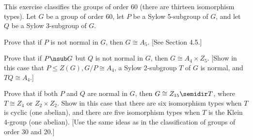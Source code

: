 \begin{specialexercise}\label{ex5.5.14}
    This exercise classifies the groups of order 60 (there are thirteen isomorphism types). Let $G$ be a group of order 60, let $P$ be a Sylow 5-subgroup of $G$, and let $Q$ be a Sylow 3-subgroup of $G$.
    \begin{subproblems}
        \item Prove that if $P$ is not normal in $G$, then $G \cong A_5$. [See Section 4.5.]
        \item Prove that if $P \nsub G$ but $Q$ is not normal in $G$, then $G \cong A_4 \times Z_5$. [Show in this case that $P \leq Z(G), G/P \cong A_4$, a Sylow 2-subgroup $T$ of $G$ is normal, and $TQ \cong A_4$.]
        \item Prove that if both $P$ and $Q$ are normal in $G$, then $G \cong Z_{15} \semidir T$, where $T \cong Z_4$ or $Z_2 \times Z_2$. Show in this case that there are six isomorphism types when $T$ is cyclic (one abelian), and there are five isomorphism types when $T$ is the Klein 4-group (one abelian). [Use the same ideas as in the classification of groups of order 30 and 20.]
    \end{subproblems}
\end{specialexercise}

